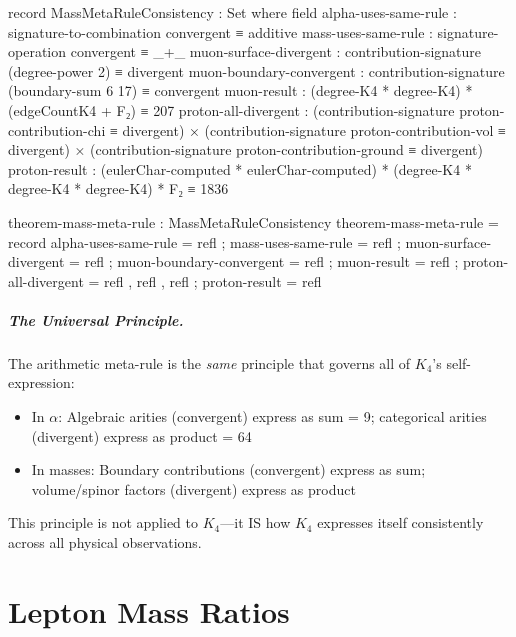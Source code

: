 \documentclass[11pt,a4paper]{book}
\begin{document}
\begin{code}
record MassMetaRuleConsistency : Set where
  field
    alpha-uses-same-rule     : signature-to-combination convergent ≡ additive
    mass-uses-same-rule      : signature-operation convergent ≡ _+_
    muon-surface-divergent   : contribution-signature (degree-power 2) ≡ divergent
    muon-boundary-convergent : contribution-signature (boundary-sum 6 17) ≡ convergent
    muon-result              : (degree-K4 * degree-K4) * (edgeCountK4 + F₂) ≡ 207
    proton-all-divergent     : (contribution-signature proton-contribution-chi ≡ divergent) ×
                               (contribution-signature proton-contribution-vol ≡ divergent) ×
                               (contribution-signature proton-contribution-ground ≡ divergent)
    proton-result            : (eulerChar-computed * eulerChar-computed) * (degree-K4 * degree-K4 * degree-K4) * F₂ ≡ 1836

theorem-mass-meta-rule : MassMetaRuleConsistency
theorem-mass-meta-rule = record
  { alpha-uses-same-rule     = refl
  ; mass-uses-same-rule      = refl
  ; muon-surface-divergent   = refl
  ; muon-boundary-convergent = refl
  ; muon-result              = refl
  ; proton-all-divergent     = refl , refl , refl
  ; proton-result            = refl
  }
\end{code}

\paragraph{The Universal Principle.}

The arithmetic meta-rule is the \emph{same} principle that governs all of $K_4$'s self-expression:
\begin{itemize}
\item In $\alpha$: Algebraic arities (convergent) express as sum = 9; categorical arities (divergent) express as product = 64
\item In masses: Boundary contributions (convergent) express as sum; volume/spinor factors (divergent) express as product
\end{itemize}

This principle is not applied to $K_4$—it IS how $K_4$ expresses itself consistently across all physical observations.


\chapter{Lepton Mass Ratios}
\label{chap:lepton-masses}
\end{document}
